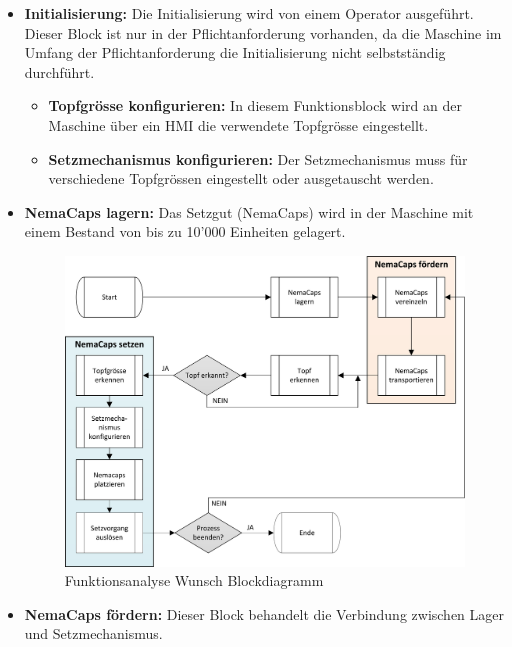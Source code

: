 \begin{itemize}
	\item \textbf{Initialisierung:} Die Initialisierung wird von einem Operator ausgeführt. Dieser Block ist nur in der Pflichtanforderung vorhanden, da die Maschine im Umfang der Pflichtanforderung die Initialisierung nicht selbstständig durchführt.
	
	\begin{itemize}
		\item \textbf{Topfgrösse konfigurieren:} In diesem Funktionsblock wird an der Maschine über ein HMI die verwendete Topfgrösse eingestellt.

		\item \textbf{Setzmechanismus konfigurieren:} Der Setzmechanismus muss für verschiedene Topfgrössen eingestellt oder ausgetauscht werden.
	\end{itemize}
	
	\item \textbf{NemaCaps lagern:} Das Setzgut (NemaCaps) wird in der Maschine mit einem Bestand von bis zu 10'000 Einheiten gelagert.
	
	\begin{figure}[H]
		\includegraphics[width=1\textwidth]{Illustrationen/4-Entwurf/Funktionsanalyse_Wunsch.png}
		\caption{Funktionsanalyse Wunsch Blockdiagramm}
		\label{fig:FunktWunsch}
	\end{figure}
	
	\item \textbf{NemaCaps fördern:} Dieser Block behandelt die Verbindung zwischen Lager und Setzmechanismus.
	

\end{itemize}
